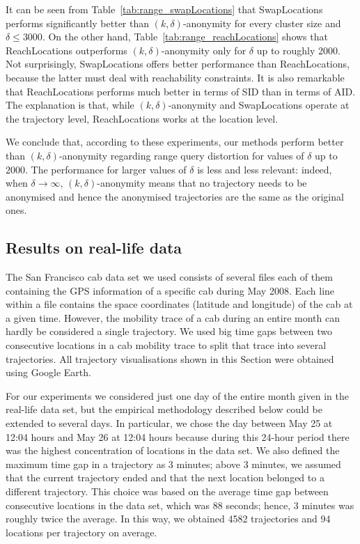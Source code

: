It can be seen from Table~\ref{tab:range_swapLocations}
that SwapLocations performs significantly better than $(k, \delta)$-anonymity
for every cluster size and $\delta \leq 3000$. On
the other hand, Table~\ref{tab:range_reachLocations}
shows that ReachLocations outperforms $(k, \delta)$-anonymity only
for $\delta$ up to roughly 2000. Not surprisingly,
SwapLocations offers better performance than ReachLocations,
because the latter must deal with reachability constraints.
It is also remarkable that ReachLocations performs much better in
terms of SID than in terms of AID. The explanation is that,
while $(k, \delta)$-anonymity and SwapLocations operate at the trajectory
level, ReachLocations works at the location level.

We conclude that, according to these experiments,
our methods perform better than $(k, \delta)$-anonymity
regarding range query distortion for values of $\delta$ up to $2000$.
The performance for larger values of $\delta$ is less
and less relevant: indeed,
when $\delta \rightarrow \infty$, $(k, \delta)$-anonymity means
that no trajectory needs to be anonymised and hence the anonymised
trajectories are the same as the original ones.


\subsection{Results on real-life data}



The San Francisco cab data set \cite{comsnets09piorkowski}
we used consists of several files each of them
containing the GPS information of a specific cab during May 2008.
Each line within a file contains the space coordinates (latitude and longitude)
of the cab at a given time. However,
the mobility trace of a cab during an entire month can hardly be
considered a single trajectory.
We used big time gaps between two consecutive locations
in a cab mobility trace to split that trace into several
trajectories. All trajectory visualisations shown in this Section
were obtained using Google Earth.

For our experiments we considered just one
day of the entire month given in the real-life data set, but
the empirical methodology described below could be extended to several days.
In particular, we chose the day between May 25 at 12:04 hours
and May 26 at 12:04 hours because during this 24-hour period
there was the highest
concentration of locations in the data set. We also defined
the maximum time gap in a trajectory as 3 minutes; above 3 minutes,
we assumed that the current trajectory ended and that the next location
belonged to a different trajectory. This choice was based on
the average time gap between consecutive locations in the data set,
which was 88 seconds; hence, 3 minutes was roughly twice the average.
In this way, we obtained 4582 trajectories and 94 locations
per trajectory on average.

